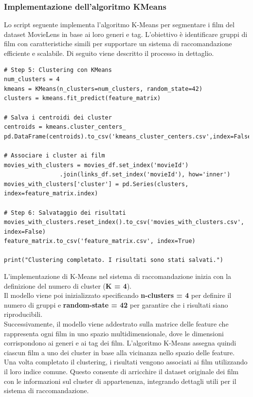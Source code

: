 \documentclass[a4paper,12pt]{article}
\begin{document}
\subsubsection{Implementazione dell'algoritmo KMeans}
Lo script seguente implementa l'algoritmo K-Means per segmentare i film del dataset MovieLens in base ai loro generi e tag.
L'obiettivo è identificare gruppi di film con caratteristiche simili per supportare un sistema di raccomandazione efficiente e scalabile. Di seguito viene descritto il processo in dettaglio.
\begin{center}
\begin{verbatim}
# Step 5: Clustering con KMeans
num_clusters = 4
kmeans = KMeans(n_clusters=num_clusters, random_state=42)
clusters = kmeans.fit_predict(feature_matrix)

# Salva i centroidi dei cluster
centroids = kmeans.cluster_centers_
pd.DataFrame(centroids).to_csv('kmeans_cluster_centers.csv',index=False,header=False)

# Associare i cluster ai film
movies_with_clusters = movies_df.set_index('movieId')
				.join(links_df.set_index('movieId'), how='inner')
movies_with_clusters['cluster'] = pd.Series(clusters, index=feature_matrix.index)

# Step 6: Salvataggio dei risultati
movies_with_clusters.reset_index().to_csv('movies_with_clusters.csv', index=False)
feature_matrix.to_csv('feature_matrix.csv', index=True)

print("Clustering completato. I risultati sono stati salvati.")
\end{verbatim}
\end{center}
L'implementazione di K-Means nel sistema di raccomandazione inizia con la definizione del numero di cluster (\textbf{K = 4}). \\Il modello viene poi inizializzato specificando \textbf{n-clusters = 4 }per definire il numero di gruppi e \textbf{random-state = 42 }per garantire che i risultati siano riproducibili.\\
Successivamente, il modello viene addestrato sulla matrice delle feature che rappresenta ogni film in uno spazio multidimensionale, dove le dimensioni corrispondono ai generi e ai tag dei film. L'algoritmo K-Means assegna quindi ciascun film a uno dei cluster in base alla vicinanza nello spazio delle feature.\\
Una volta completato il clustering, i risultati vengono associati ai film utilizzando il loro indice comune. Questo consente di arricchire il dataset originale dei film con le informazioni sul cluster di appartenenza, integrando dettagli utili per il sistema di raccomandazione.
\end{document}
